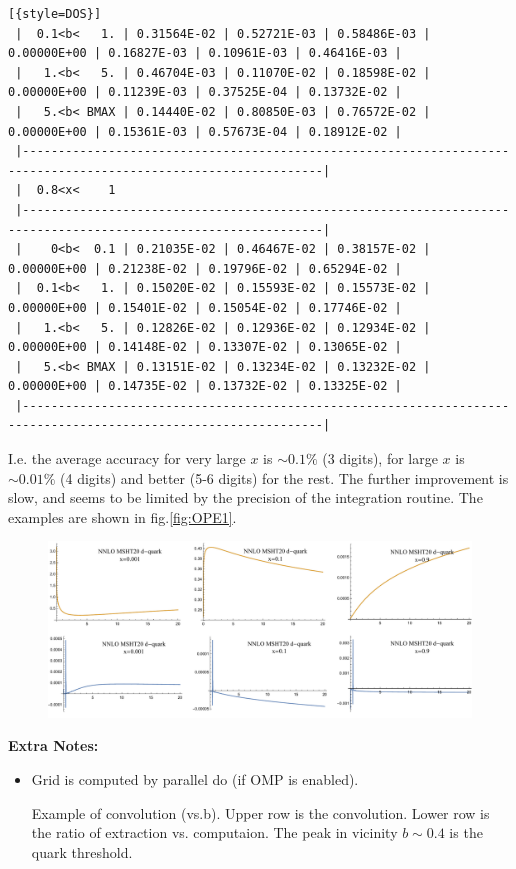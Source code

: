 \documentclass[prd,nofootinbib,eqsecnum,final]{revtex4}
\renewcommand{\(}{\left(}
\renewcommand{\)}{\right)}
\renewcommand{\[}{\left[}
\renewcommand{\]}{\right]}
\begin{document}
\begin{lstlisting}[{style=DOS}]
 |  0.1<b<   1. | 0.31564E-02 | 0.52721E-03 | 0.58486E-03 | 0.00000E+00 | 0.16827E-03 | 0.10961E-03 | 0.46416E-03 |
 |   1.<b<   5. | 0.46704E-03 | 0.11070E-02 | 0.18598E-02 | 0.00000E+00 | 0.11239E-03 | 0.37525E-04 | 0.13732E-02 |
 |   5.<b< BMAX | 0.14440E-02 | 0.80850E-03 | 0.76572E-02 | 0.00000E+00 | 0.15361E-03 | 0.57673E-04 | 0.18912E-02 |
 |----------------------------------------------------------------------------------------------------------------|
 |  0.8<x<    1
 |----------------------------------------------------------------------------------------------------------------|
 |    0<b<  0.1 | 0.21035E-02 | 0.46467E-02 | 0.38157E-02 | 0.00000E+00 | 0.21238E-02 | 0.19796E-02 | 0.65294E-02 |
 |  0.1<b<   1. | 0.15020E-02 | 0.15593E-02 | 0.15573E-02 | 0.00000E+00 | 0.15401E-02 | 0.15054E-02 | 0.17746E-02 |
 |   1.<b<   5. | 0.12826E-02 | 0.12936E-02 | 0.12934E-02 | 0.00000E+00 | 0.14148E-02 | 0.13307E-02 | 0.13065E-02 |
 |   5.<b< BMAX | 0.13151E-02 | 0.13234E-02 | 0.13232E-02 | 0.00000E+00 | 0.14735E-02 | 0.13732E-02 | 0.13325E-02 |
 |----------------------------------------------------------------------------------------------------------------|
\end{lstlisting}
I.e. the average accuracy for very large $x$ is $\sim 0.1\%$ (3 digits), for large $x$ is $\sim 0.01\%$ (4 digits) and better (5-6 digits) for the rest. The further improvement is slow, and seems to be limited by the precision of the integration routine. The examples are shown in fig.\ref{fig:OPE1}.

\begin{figure}
\begin{center}
\includegraphics[width=\textwidth]{Figures/uTMDPDF_OPE.pdf}
\end{center}
\end{figure}


\textbf{Extra Notes:}
\begin{itemize}
\item Grid is computed by parallel do (if OMP is enabled).
\caption{\label{fig:OPE1} Example of convolution (vs.b). Upper row is the convolution. Lower row is the ratio of extraction vs. computaion. The peak in vicinity $b\sim 0.4$ is the quark threshold.}
\end{itemize}
\end{document}
